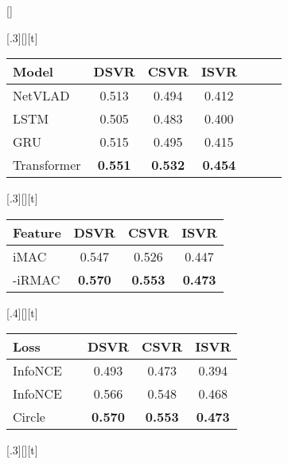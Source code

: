 \documentclass[10pt,twocolumn,letterpaper]{article}
\begin{document}
\begin{table*}[t]
[\textwidth]{\begin{subfloatrow}
[.3\textwidth][\FBheight][t]{\caption{\textbf{Model} (mAP on FIVR-5K)} \label{subtab:model}}{
    \centering
    \setlength{\tabcolsep}{4pt}
    \begin{tabular}{lcccccc}
Model & DSVR  & CSVR  & ISVR \\ 
\toprule
    NetVLAD     & 0.513 & 0.494 & 0.412 \\
    LSTM        & 0.505 & 0.483 & 0.400 \\
    GRU         & 0.515 & 0.495 & 0.415 \\
    Transformer & \textbf{0.551} & \textbf{0.532} & \textbf{0.454} \\
\end{tabular}
}
[.3\textwidth][\FBheight][t]{\caption{\textbf{Feature} (mAP on FIVR-200K)} \label{subtab:feature}}{
    \centering
    \setlength{\tabcolsep}{4pt}
    \begin{tabular}{lccc}
    Feature & DSVR  & CSVR  & ISVR  \\
    \toprule
    iMAC    & 0.547 & 0.526 & 0.447 \\
    -iRMAC  & \textbf{0.570} & \textbf{0.553} & \textbf{0.473} \\
    \end{tabular}
}
[.4\textwidth][\FBheight][t]{\caption{\textbf{Loss function} (mAP on FIVR-200K)} \label{subtab:loss}}{
    \centering
    \setlength{\tabcolsep}{2pt}
    \begin{tabular}{lcccc}
    Loss &  & DSVR  & CSVR  & ISVR  \\
    \toprule
    InfoNCE &    & 0.493          & 0.473          & 0.394          \\
    InfoNCE &   & 0.566          & 0.548          & 0.468          \\
    Circle  &     & \textbf{0.570} & \textbf{0.553} & \textbf{0.473} \\
    \end{tabular}
}
\end{subfloatrow}
\par\nointerlineskip\vspace{8pt}
\begin{subfloatrow}
[.3\textwidth][\FBheight][t]{\caption{\textbf{Bank size} (mAP on FIVR-5K)} \label{subtab:banksz}}{
    \centering
    \setlength{\tabcolsep}{2pt}
    \begin{tabular}{lcccc}

\end{tabular}}
\end{subfloatrow}}
\end{table*}
\end{document}
